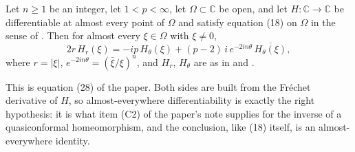 \begin{lemma}
Let $n\ge1$ be an integer, let $1<p<\infty$, let $\Omega\subset\mathbb{C}$ be
open, and let $H\colon\mathbb{C}\to\mathbb{C}$ be differentiable at almost
every point of $\Omega$ and satisfy equation (18) on $\Omega$ in the sense of
.
Then for almost every $\xi\in\Omega$ with $\xi\neq0$,
\[
  2r\,H_r(\xi)=-ip\,H_\theta(\xi)+(p-2)\,i\,e^{-2in\theta}\,\overline{H_\theta(\xi)},
\]
where $r=|\xi|$, $e^{-2in\theta}=(\bar\xi/\xi)^{n}$, and $H_r$, $H_\theta$ are
as in  and .

This is equation (28) of the paper.  Both sides are built from the Fr\'echet
derivative of $H$, so almost-everywhere differentiability is exactly the right
hypothesis: it is what item (C2) of the paper's note supplies for the inverse of
a quasiconformal homeomorphism, and the conclusion, like (18) itself, is an
almost-everywhere identity.
\end{lemma}
